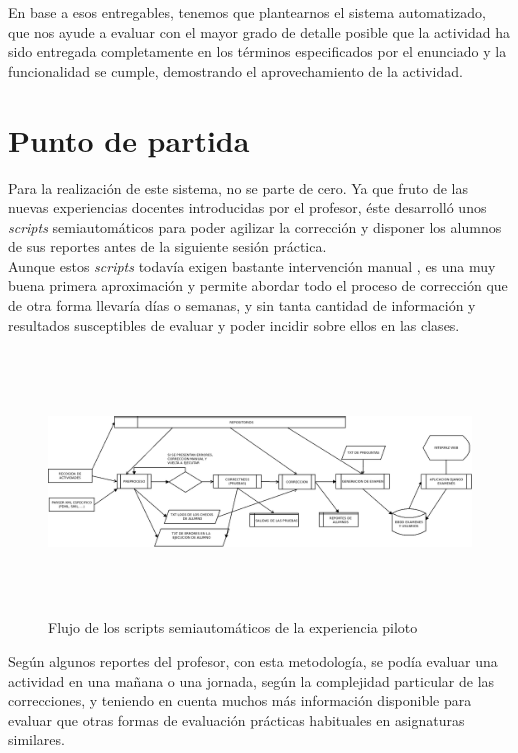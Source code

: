 En base a esos entregables, tenemos que plantearnos el sistema automatizado, que nos ayude a evaluar con el mayor grado de detalle posible que la actividad ha sido entregada completamente en los términos especificados por el enunciado y la funcionalidad se cumple, demostrando el aprovechamiento de la actividad.


\section{Punto de partida}
\label{sec:puntp_partida}


Para la realización de este sistema, no se parte de cero. Ya que fruto de las nuevas experiencias docentes introducidas por el profesor, éste desarrolló unos \textit{scripts} semiautomáticos para poder agilizar la corrección y disponer los alumnos de sus reportes antes de la siguiente sesión práctica.\\


Aunque estos \textit{scripts} todavía exigen bastante intervención manual , es una muy buena primera aproximación y permite abordar todo el proceso de corrección que de otra forma llevaría días o semanas, y sin tanta cantidad de información y resultados susceptibles de evaluar y poder incidir sobre ellos en las clases.\\

\begin{figure}[H]
   \centering
   \includegraphics[width=16cm, height=7cm]{img/Diagram1_flujo_semiautomatico}
   \caption{Flujo de los scripts semiautomáticos de la experiencia piloto}
   \label{figura:flujo_semiautomatico}
\end{figure}


Según algunos reportes del profesor, con esta metodología, se podía evaluar una actividad en una mañana o una jornada, según la complejidad particular de las correcciones, y teniendo en cuenta muchos más información disponible para evaluar que otras formas de evaluación prácticas habituales en asignaturas similares.\\



